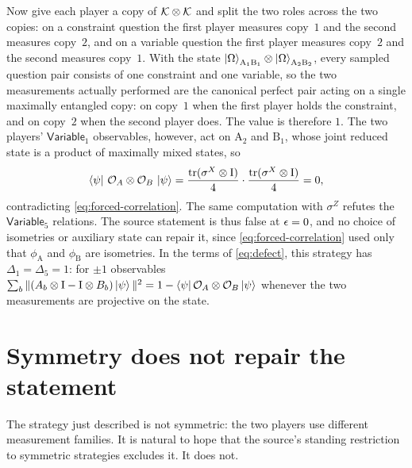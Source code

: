 \documentclass[11pt]{article}
\newcommand{\Id}{\mathrm{I}}
\newcommand{\Variable}{\mathsf{Variable}}
\begin{document}
Now give each player a copy of $\mathcal K \otimes \mathcal K$ and split the two
roles across the two copies: on a constraint question the first player measures
copy~$1$ and the second measures copy~$2$, and on a variable question the first
player measures copy~$2$ and the second measures copy~$1$.  With the state
$\ket{\Omega}_{\mathrm A_1 \mathrm B_1} \otimes
\ket{\Omega}_{\mathrm A_2 \mathrm B_2}$, every sampled question pair consists of
one constraint and one variable, so the two measurements actually performed are
the canonical perfect pair acting on a single maximally entangled copy: on
copy~$1$ when the first player holds the constraint, and on copy~$2$ when the
second player does.  The value is therefore $1$.  The two players' $\Variable_1$
observables, however, act on $\mathrm A_2$ and $\mathrm B_1$, whose joint
reduced state is a product of maximally mixed states, so
\begin{equation}
  \bra{\psi}\,\mathcal O_A \ot \mathcal O_B\,\ket{\psi}
  = \frac{\tr(\sigma^X \ot \Id)}{4} \cdot \frac{\tr(\sigma^X \ot \Id)}{4}
  = 0 ,
  \label{eq:zero-correlation}
\end{equation}
contradicting \eqref{eq:forced-correlation}.  The same computation with
$\sigma^Z$ refutes the $\Variable_5$ relations.  The source statement is thus
false at $\epsilon = 0$, and no choice of isometries or auxiliary state can repair
it, since \eqref{eq:forced-correlation} used only that $\phi_{\mathrm A}$ and
$\phi_{\mathrm B}$ are isometries.  In the terms of \eqref{eq:defect}, this
strategy has $\Delta_1 = \Delta_5 = 1$: for $\pm1$ observables
$\sum_b \|(A_b \ot \Id - \Id \ot B_b)\ket\psi\|^2
= 1 - \bra\psi \mathcal O_A \ot \mathcal O_B \ket\psi$
whenever the two measurements are projective on the state.

\section{Symmetry does not repair the statement}
\label{sec:symmetric}

The strategy just described is not symmetric: the two players use different
measurement families.  It is natural to hope that the source's standing
restriction to symmetric strategies excludes it.  It does not.
\end{document}
